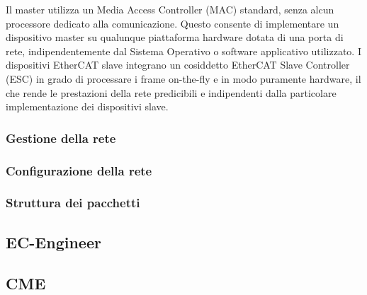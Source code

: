 Il master utilizza un Media Access Controller (MAC) standard, senza alcun processore dedicato alla comunicazione. Questo consente di implementare un dispositivo master su qualunque piattaforma hardware dotata di una porta di rete, indipendentemente dal Sistema Operativo o software applicativo utilizzato. I dispositivi EtherCAT slave integrano un cosiddetto EtherCAT Slave Controller (ESC) in grado di processare i frame on-the-fly e in modo puramente hardware, il che rende le prestazioni della rete predicibili e indipendenti dalla particolare implementazione dei dispositivi slave.
\subsubsection{Gestione della rete}
\subsubsection{Configurazione della rete}
\subsubsection{Struttura dei pacchetti}
\subsection{EC-Engineer}
\subsection{CME}
